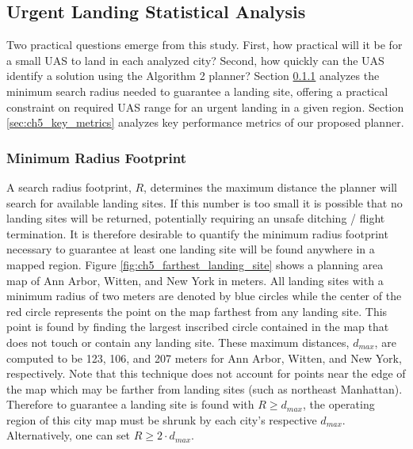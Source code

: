 \subsection{Urgent Landing Statistical Analysis}\label{sec:ch5_meta_analysis}

Two practical questions emerge from this study.  First, how practical will it be for a small UAS to land in each analyzed city?  Second, how quickly can the UAS identify a solution using the Algorithm 2 planner?  Section \ref{sec:ch5_footprints} analyzes the minimum search radius needed to guarantee a landing site, offering a practical constraint on required UAS range for an urgent landing in a given region. Section \ref{sec:ch5_key_metrics} analyzes key performance metrics of our proposed planner.

\subsubsection{Minimum Radius Footprint}\label{sec:ch5_footprints}

A search radius footprint, $R$, determines the maximum distance the planner will search for available landing sites.  If this number is too small it is possible that no landing sites will be returned, potentially requiring an unsafe ditching / flight termination. It is therefore desirable to quantify the minimum radius footprint necessary to guarantee at least one landing site will be found anywhere in a mapped region.  Figure \ref{fig:ch5_farthest_landing_site} shows a planning area map of Ann Arbor, Witten, and New York in meters. All landing sites with a minimum radius of two meters are denoted by blue circles while the center of the red circle represents the point on the map farthest  from any landing site. This point is found by finding the largest inscribed circle contained in the map that does not touch or contain any landing site. These maximum distances, $d_{max}$, are computed to be 123, 106, and 207 meters for Ann Arbor, Witten, and New York, respectively. Note that this technique does not account for points near the edge of the map which may be farther from landing sites (such as northeast Manhattan).  Therefore to guarantee a landing site is found with $R \ge d_{max}$, the operating region of this city map must be shrunk by each city's respective $d_{max}$. Alternatively, one can set $R \ge 2 \cdot d_{max}$.


